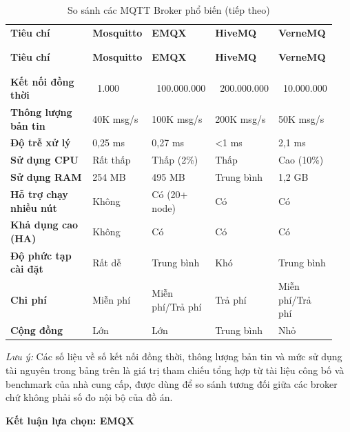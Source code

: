 \documentclass[a4paper]{extarticle}
\newcommand{\thesissettableid}[2]{%
  \renewcommand{\thetable}{#1}%
  \renewcommand{\theHtable}{#2}%
}
\begin{document}
{\thesissettableid{3.17}{tab-ch3-so-sanh-cac-mqtt-broker-pho-bien}
\def\LTcaptype{table}
\begin{longtable}{|L{0.269\linewidth}|L{0.188\linewidth}|L{0.158\linewidth}|L{0.152\linewidth}|L{0.177\linewidth}|}
\caption{So sánh các MQTT Broker phổ biến}\label{tab:ch3-so-sanh-cac-mqtt-broker-pho-bien}\\
\hline \textbf{Tiêu chí} & \textbf{Mosquitto} & \textbf{EMQX} & \textbf{HiveMQ} & \textbf{VerneMQ} \\
\\\hline
\endfirsthead
\caption[]{So sánh các MQTT Broker phổ biến (tiếp theo)}\\
\hline \textbf{Tiêu chí} & \textbf{Mosquitto} & \textbf{EMQX} & \textbf{HiveMQ} & \textbf{VerneMQ} \\
\\\hline
\endhead
\\\hline
\endfoot
\endlastfoot
\textbf{Kết nối đồng thời} & ~1.000 &
~100.000.000 & ~200.000.000 &
~10.000.000 \\\hline
\textbf{Thông lượng bản tin} & 40K msg/s & 100K msg/s & 200K msg/s & 50K
msg/s \\\hline
\textbf{Độ trễ xử lý} & 0,25 ms & 0,27 ms & \textless1 ms & 2,1
ms \\\hline
\textbf{Sử dụng CPU} & Rất thấp & Thấp (2\%) & Thấp & Cao (10\%) \\\hline
\textbf{Sử dụng RAM} & 254 MB & 495 MB & Trung bình & 1,2 GB \\\hline
\textbf{Hỗ trợ chạy nhiều nút} & Không & Có (20+ node) & Có & Có \\\hline
\textbf{Khả dụng cao (HA)} & Không & Có & Có & Có \\\hline
\textbf{Độ phức tạp cài đặt} & Rất dễ & Trung bình & Khó & Trung bình \\\hline
\textbf{Chi phí} & Miễn phí & Miễn phí/Trả phí & Trả phí & Miễn phí/Trả
phí \\\hline
\textbf{Cộng đồng} & Lớn & Lớn & Trung bình & Nhỏ \\\hline
\end{longtable}
}

\textit{Lưu ý:} Các số liệu về số kết nối đồng thời, thông lượng bản tin
và mức sử dụng tài nguyên trong bảng trên là giá trị tham chiếu tổng hợp
 từ tài liệu công bố và benchmark của nhà cung cấp, được dùng để so sánh
 tương đối giữa các broker chứ không phải số đo nội bộ của đồ án.

\textbf{Kết luận lựa chọn: EMQX}
\end{document}
